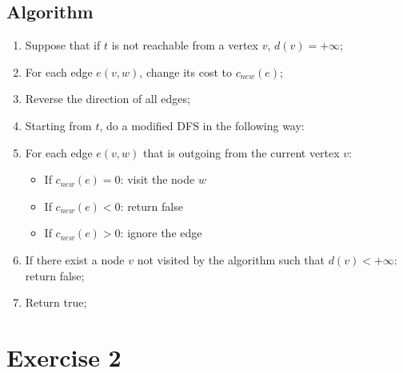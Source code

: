 \documentclass[]{article}
\begin{document}
\subsection{Algorithm}

\begin{enumerate}

\item Suppose that if $t$ is not reachable from a vertex $v$, $ d(v) = + \infty$;
\item For each edge $e(v,w)$, change its cost to $ c_{new}(e) $;

\item Reverse the direction of all edges;

\item Starting from $t$, do a modified DFS in the following way:

\item For each edge $e(v,w)$ that is outgoing from the current vertex $v$:

\begin{itemize}


\item If $c_{new}(e) = 0$: visit the node $w$
\item If $c_{new}(e) < 0$: return false
\item If $c_{new}(e) > 0$: ignore the edge

\end{itemize}

\item If there exist a node $v$ not visited by the algorithm such that $d(v) < +\infty$: return false;
\item Return true;


\end{enumerate}


\section{Exercise 2}
\end{document}
